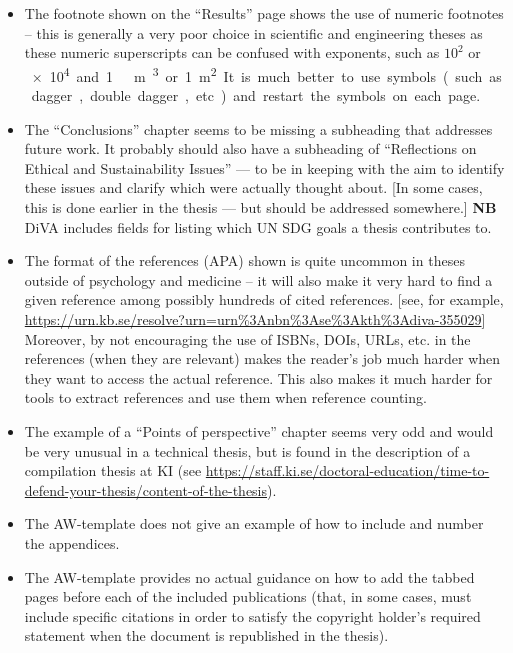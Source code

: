 \documentclass[12pt, twoside]{article}
\begin{document}
\clearpage
\begin{itemize}[resume*, label=\color{red}]
\item The footnote shown on the \enquote{Results} page shows the use of numeric footnotes -- this is generally a very poor choice in scientific and engineering theses as these numeric superscripts can be confused with exponents, such as $10^{2}$ or \qty{e4} and 1\ m\textsuperscript{3} or \qty{1}{\metre\squared}.  It is much better to use symbols (such as dagger, double dagger, etc.) and restart the symbols on each page.

\item The \enquote{Conclusions} chapter seems to be missing a subheading that addresses future work. It probably should also have a subheading of \enquote{Reflections on Ethical and Sustainability Issues} --- to be in keeping with the aim to identify these issues and clarify which were actually thought about. [In some cases, this is done earlier in the thesis --- but should be addressed somewhere.] \textbf{NB} \gls{DiVA} includes fields for listing which UN SDG goals a thesis contributes to.

\item The format of the references (APA) shown is quite uncommon in theses outside of psychology and medicine -- it will also make it very hard to find a given reference among possibly hundreds of cited references. [see, for example,
\url{https://urn.kb.se/resolve?urn=urn%3Anbn%3Ase%3Akth%3Adiva-355029}]
Moreover, by not encouraging the use of \glspl{ISBN}, \glspl{DOI}, \glspl{URL}, etc. in the references (when they are relevant) makes the reader's job much harder when they want to access the actual reference. This also makes it much harder for tools to extract references and use them when reference counting.

\item  The example of a \enquote{Points of perspective} chapter seems very odd and would be very unusual in a technical thesis, but is found in the description of a compilation thesis at \gls{KI} (see \url{https://staff.ki.se/doctoral-education/time-to-defend-your-thesis/content-of-the-thesis}).

\item The AW-template does not give an example of how to include and number the appendices.

\item The AW-template provides no actual guidance on how to add the tabbed pages before each of the included publications (that, in some cases, must include specific citations in order to satisfy the copyright holder's required statement when the document is republished in the thesis).
\end{itemize}
\end{document}
